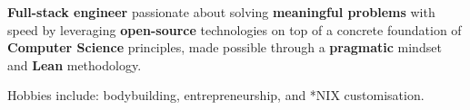 

\begin{cvparagraph}
  \textbf{Full-stack engineer} passionate about solving \textbf{meaningful problems} with speed by leveraging \textbf{open-source} technologies on top of a concrete foundation of \textbf{Computer Science} principles, made possible through a \textbf{pragmatic} mindset and \textbf{Lean} methodology.
  
  {\footnotesize Hobbies include: bodybuilding, entrepreneurship, and *NIX customisation.}
\end{cvparagraph}
